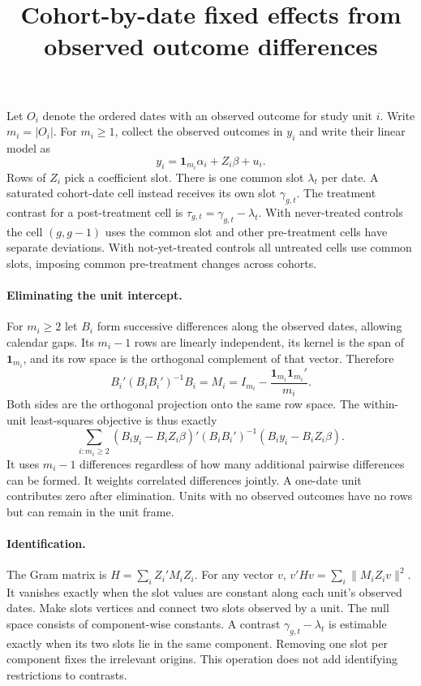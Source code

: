 \documentclass[11pt]{article}
\title{Cohort-by-date fixed effects from observed outcome differences}
\author{}
\date{}
\begin{document}
\maketitle

Let \(O_i\) denote the ordered dates with an observed outcome for study unit \(i\).
Write \(m_i=|O_i|\). For \(m_i\ge 1\), collect the observed outcomes in \(y_i\)
and write their linear model as
\[
  y_i = \mathbf{1}_{m_i}\alpha_i + Z_i\beta + u_i.
\]
Rows of \(Z_i\) pick a coefficient slot. There is one common slot \(\lambda_t\)
per date. A saturated cohort-date cell instead receives its own slot
\(\gamma_{g,t}\). The treatment contrast for a post-treatment cell is
\(\tau_{g,t}=\gamma_{g,t}-\lambda_t\). With never-treated controls the
cell \((g,g-1)\) uses the common slot and other pre-treatment cells have
separate deviations. With not-yet-treated controls all untreated cells use
common slots, imposing common pre-treatment changes across cohorts.

\paragraph{Eliminating the unit intercept.}
For \(m_i\ge 2\) let \(B_i\) form successive differences along the observed
dates, allowing calendar gaps. Its \(m_i-1\) rows are linearly independent,
its kernel is the span of \(\mathbf{1}_{m_i}\), and its row space is the
orthogonal complement of that vector. Therefore
\[
  B_i' (B_i B_i')^{-1} B_i
  = M_i
  = I_{m_i}-\frac{\mathbf{1}_{m_i}\mathbf{1}_{m_i}'}{m_i}.
\]
Both sides are the orthogonal projection onto the same row space. The
within-unit least-squares objective is thus exactly
\[
  \sum_{i:m_i\ge 2}
  (B_i y_i-B_i Z_i\beta)'(B_i B_i')^{-1}(B_i y_i-B_i Z_i\beta).
\]
It uses \(m_i-1\) differences regardless of how many additional pairwise
differences can be formed. It weights correlated differences jointly.
A one-date unit contributes zero after elimination. Units with no observed
outcomes have no rows but can remain in the unit frame.

\paragraph{Identification.}
The Gram matrix is \(H=\sum_i Z_i'M_iZ_i\).
For any vector \(v\), \(v'Hv=\sum_i\lVert M_i Z_i v\rVert^2\).
It vanishes exactly when the slot values are constant along each unit's
observed dates. Make slots vertices and connect two slots observed by a
unit. The null space consists of component-wise constants. A contrast
\(\gamma_{g,t}-\lambda_t\) is estimable exactly when its two slots lie in
the same component. Removing one slot per component fixes the irrelevant
origins. This operation does not add identifying restrictions to contrasts.
\end{document}
